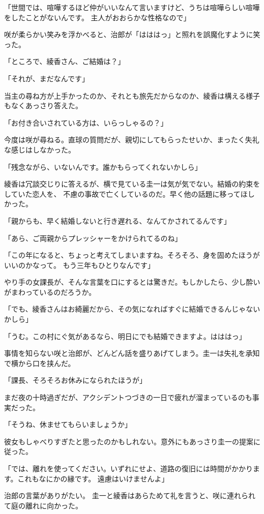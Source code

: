 ﻿\documentclass[
    book,tate,
    line_length=30zw,
    jafontsize=12pt,
    paper=b5j,
    landscape,
    ]{jlreq}
\begin{document}
「世間では、喧嘩するほど仲がいいなんて言いますけど、うちは喧嘩らしい喧嘩をしたことがないんです。 
主人がおおらかな性格なので」

咲が柔らかい笑みを浮かべると、治郎が「はははっ」と照れを誤魔化すように笑った。

「ところで、綾香さん、ご結婚は？」

「それが、まだなんです」

当主の尋ね方が上手かったのか、それとも旅先だからなのか、綾香は構える様子もなくあっさり答えた。

「お付き合いされている方は、いらっしゃるの？」

今度は咲が尋ねる。直球の質問だが、親切にしてもらったせいか、まったく失礼な感じはしなかった。

「残念ながら、いないんです。誰かもらってくれないかしら」

綾香は冗談交じりに答えるが、横で見ている圭一は気が気でない。結婚の約束をしていた恋人を、
不慮の事故で亡くしているのだ。早く他の話題に移ってほしかった。

「親からも、早く結婚しないと行き遅れる、なんてかされてるんです」

「あら、ご両親からプレッシャーをかけられてるのね」

「この年になると、ちょっと考えてしまいますね。そろそろ、身を固めたほうがいいのかなって。
もう三年もひとりなんです」

やり手の女課長が、そんな言葉を口にするとは驚きだ。もしかしたら、少し酔いがまわっているのだろうか。

「でも、綾香さんはお綺麗だから、その気になればすぐに結婚できるんじゃないかしら」

「うむ。この村にぐ気があるなら、明日にでも結婚できますよ。はははっ」

事情を知らない咲と治郎が、どんどん話を盛りあげてしまう。圭一は失礼を承知で横から口を挟んだ。

「課長、そろそろお休みになられたほうが」

まだ夜の十時過ぎだが、アクシデントつづきの一日で疲れが溜まっているのも事実だった。

「そうね、休ませてもらいましょうか」

彼女もしゃべりすぎたと思ったのかもしれない。意外にもあっさり圭一の提案に従った。

「では、離れを使ってください。いずれにせよ、道路の復旧には時間がかかります。これもなにかの縁です。
遠慮はいけませんよ」

治郎の言葉がありがたい。 圭一と綾香はあらためて礼を言うと、咲に連れられて庭の離れに向かった。
\end{document}
